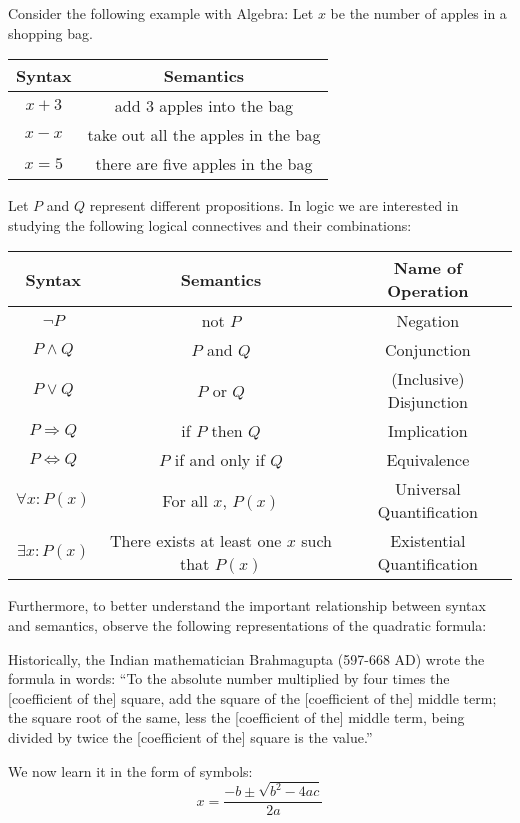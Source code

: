 \documentclass[11pt, a4paper, oneside]{exam}
\theoremstyle{definition}\newtheorem{define}{Definition}[section]
\theoremstyle{remark}\newtheorem{remark}{Remark}
\theoremstyle{definition}\newtheorem{example}{Example}[subsection]
\theoremstyle{definition}\newtheorem{notation}{Notation}[section]
\theoremstyle{definition}\newtheorem{theorem}{Theorem}[section]
\theoremstyle{definition}\newtheorem{corollary}{Corollary}[section]
\begin{document}
Consider the following example with Algebra: Let $x$ be the number of apples in a shopping bag.

\begin{center}
\begin{tabular}{|c|c|}\hline
	Syntax & Semantics\\ \hline
	$x+3$ & add 3 apples into the bag\\
	$x-x$ & take out all the apples in the bag\\
	$x=5$ & there are five apples in the bag\\ \hline
\end{tabular}
\end{center}

Let $P$ and $Q$ represent different propositions. In logic we are interested in studying the following logical connectives and their combinations:

\begin{center}
\begin{tabular}{|c|c|c|}\hline
	Syntax & Semantics & Name of Operation\\ \hline
	$\neg P$ & not $P$ & Negation\\
	$P \land Q$ & $P$ and $Q$ & Conjunction\\
	$P \lor Q$ & $P$ or $Q$ &(Inclusive) Disjunction\\
	$P \Rightarrow Q$ & if $P$ then $Q$ & Implication\\
	$P \Leftrightarrow Q$ & $P$ if and only if $Q$ & Equivalence\\ 
	$\forall x: P(x)$ & For all $x$, $P(x)$ & Universal Quantification\\ 
	$\exists x: P(x)$ & There exists at least one $x$ such that $P(x)$ & Existential Quantification\\ \hline
\end{tabular}
\end{center}

Furthermore, to better understand the important relationship between syntax and semantics, observe the following representations of the quadratic formula:

Historically, the Indian mathematician Brahmagupta (597-668 AD) wrote the formula in words: ``To the absolute number multiplied by four times the [coefficient of the] square, add the square of the [coefficient of the] middle term; the square root of the same, less the [coefficient of the] middle term, being divided by twice the [coefficient of the] square is the value.''

We now learn it in the form of symbols:
\[ x = \frac{-b \pm \sqrt{b^2 -4ac}}{2a} \]
\end{document}

